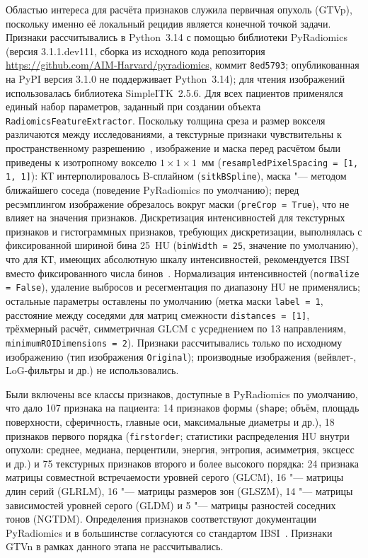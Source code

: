 \documentclass[11pt,a4paper]{article}
\newcommand{\Nfeat}{107}
\begin{document}
Областью интереса для расчёта признаков служила первичная опухоль (GTVp), поскольку именно её локальный рецидив является конечной точкой задачи. Признаки рассчитывались в Python~3.14 с помощью библиотеки PyRadiomics~\cite{vangriethuysen2017} (версия 3.1.1.dev111, сборка из исходного кода репозитория \url{https://github.com/AIM-Harvard/pyradiomics}, коммит \texttt{8ed5793}; опубликованная на PyPI версия 3.1.0 не поддерживает Python~3.14); для чтения изображений использовалась библиотека SimpleITK~2.5.6. Для всех пациентов применялся единый набор параметров, заданный при создании объекта \texttt{RadiomicsFeatureExtractor}. Поскольку толщина среза и размер вокселя различаются между исследованиями, а текстурные признаки чувствительны к пространственному разрешению~\cite{zwanenburg2020}, изображение и маска перед расчётом были приведены к изотропному вокселю $1\times1\times1$~мм (\texttt{resampledPixelSpacing = [1, 1, 1]}): КТ интерполировалось B-сплайном (\texttt{sitkBSpline}), маска "--- методом ближайшего соседа (поведение PyRadiomics по умолчанию); перед ресэмплингом изображение обрезалось вокруг маски (\texttt{preCrop = True}), что не влияет на значения признаков. Дискретизация интенсивностей для текстурных признаков и гистограммных признаков, требующих дискретизации, выполнялась с фиксированной шириной бина 25~HU (\texttt{binWidth = 25}, значение по умолчанию), что для КТ, имеющих абсолютную шкалу интенсивностей, рекомендуется IBSI вместо фиксированного числа бинов~\cite{zwanenburg2020}. Нормализация интенсивностей (\texttt{normalize = False}), удаление выбросов и ресегментация по диапазону HU не применялись; остальные параметры оставлены по умолчанию (метка маски \texttt{label = 1}, расстояние между соседями для матриц смежности \texttt{distances = [1]}, трёхмерный расчёт, симметричная GLCM с усреднением по 13 направлениям, \texttt{minimumROIDimensions = 2}). Признаки рассчитывались только по исходному изображению (тип изображения \texttt{Original}); производные изображения (вейвлет-, LoG-фильтры и др.) не использовались.

Были включены все классы признаков, доступные в PyRadiomics по умолчанию, что дало \Nfeat{} признака на пациента: 14 признаков формы (\texttt{shape}; объём, площадь поверхности, сферичность, главные оси, максимальные диаметры и др.), 18 признаков первого порядка (\texttt{firstorder}; статистики распределения HU внутри опухоли: среднее, медиана, перцентили, энергия, энтропия, асимметрия, эксцесс и др.) и 75 текстурных признаков второго и более высокого порядка: 24 признака матрицы совместной встречаемости уровней серого (GLCM), 16 "--- матрицы длин серий (GLRLM), 16 "--- матрицы размеров зон (GLSZM), 14 "--- матрицы зависимостей уровней серого (GLDM) и 5 "--- матрицы разностей соседних тонов (NGTDM). Определения признаков соответствуют документации PyRadiomics и в большинстве согласуются со стандартом IBSI~\cite{zwanenburg2020}. Признаки GTVn в рамках данного этапа не рассчитывались.
\end{document}
